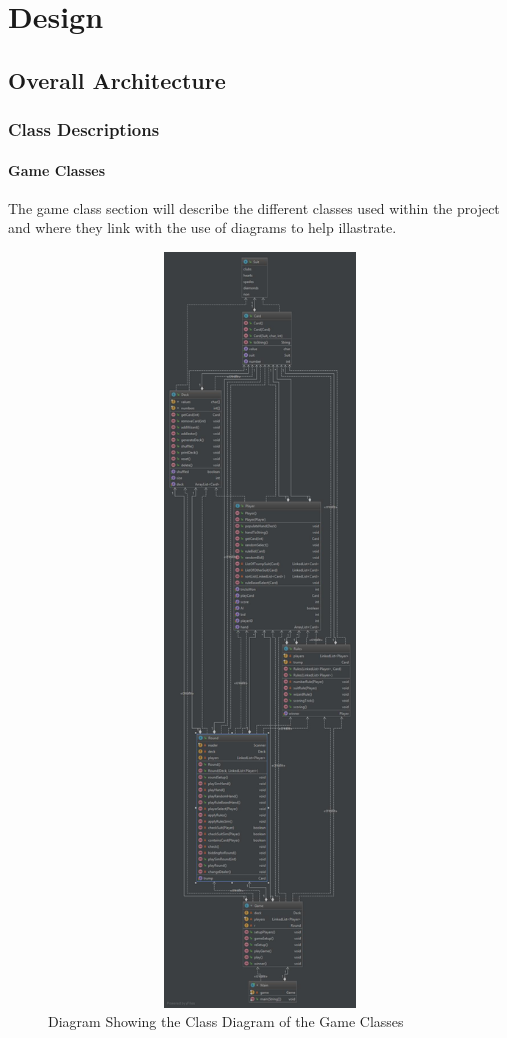 \chapter{Design}

\section{Overall Architecture}

\subsection{Class Descriptions}
\subsubsection{Game Classes}
The game class section will describe the different classes used within the project and where they link with the use of diagrams to help illastrate.
\begin{figure}[h]
\centering
\label{fig:Game_Classes}
\includegraphics[width=15cm ,height=20cm,keepaspectratio]{Game_Classes}
\caption{Diagram Showing the Class Diagram of the Game Classes}
\end{figure}
